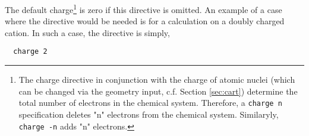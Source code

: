 The default charge\footnote{The charge directive in conjunction with
  the charge of atomic nuclei (which can be changed via the geometry
  input, c.f. Section \ref{sec:cart}) determine the total number of
  electrons in the chemical system.  Therefore, a \verb+charge n+
  specification deletes "n" electrons from the chemical system.
  Similaryly, \verb+charge -n+ adds "n" electrons.} is zero
if this directive is omitted.  An example of a case where the
directive would be needed is for a calculation on a doubly charged
cation.  In such a case, the directive is simply,
\begin{verbatim}
  charge 2
\end{verbatim}

%
